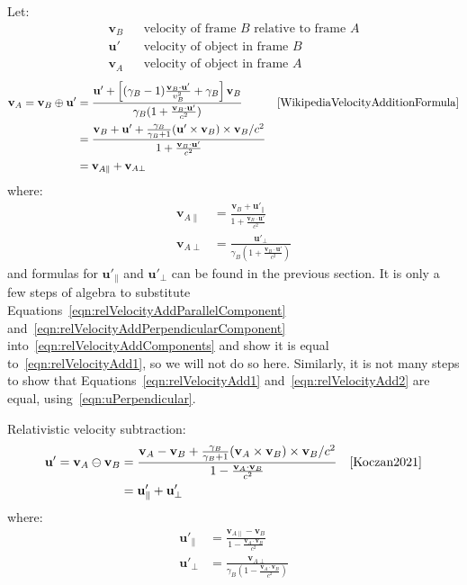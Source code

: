 \documentclass[a4paper]{article}
\theoremstyle{plain}
\theoremstyle{definition}
\newcommand{\vect}[1]{\mathbf{#1}}
\begin{document}
Let:
\begin{align*}
  \vect{v}_B & & \text{velocity of frame $B$ relative to frame $A$} \\
  \vect{u}' & & \text{velocity of object in frame $B$} \\
  \vect{v}_A & & \text{velocity of object in frame $A$}
\end{align*}
\begin{align}
\vect{v}_A = \vect{v}_B \oplus \vect{u}'
  & = \frac{ \vect{u}' + \left[ (\gamma_B-1) \frac{\vect{v}_B \cdot \vect{u}'}{v_B^2} + \gamma_B \right] \vect{v}_B }
           { \gamma_B (1 + \frac{\vect{v}_B \cdot \vect{u}'}{c^2}) } & & \text{\cite{WikipediaVelocityAdditionFormula}} \label{eqn:relVelocityAdd1} \\
  & = \frac{ \vect{v}_B + \vect{u}' + \frac{\gamma_B}{\gamma_B+1} (\vect{u}' \times \vect{v}_B) \times \vect{v}_B / c^2 }
           { 1 + \frac{\vect{v}_B \cdot \vect{u}'}{c^2} } \label{eqn:relVelocityAdd2} \\
  & = \vect{v}_{A \parallel} + \vect{v}_{A \perp} \label{eqn:relVelocityAddComponents}
\end{align}
where:
\begin{align}
\vect{v}_{A \parallel}
  & = \frac{ \vect{v}_B + \vect{u}'_{\parallel} }{1 + \frac{ \vect{v}_B \cdot \vect{u}'}{c^2} } \label{eqn:relVelocityAddParallelComponent} \\
\vect{v}_{A \perp}
  & = \frac{ \vect{u}'_{\perp} }{\gamma_B (1 + \frac{ \vect{v}_B \cdot \vect{u}'}{c^2} )} \label{eqn:relVelocityAddPerpendicularComponent}
\end{align}
and formulas for $\vect{u}'_{\parallel}$ and $\vect{u}'_{\perp}$ can
be found in the previous section.  It is only a few steps of algebra
to substitute Equations~\eqref{eqn:relVelocityAddParallelComponent}
and~\eqref{eqn:relVelocityAddPerpendicularComponent}
into~\eqref{eqn:relVelocityAddComponents} and show it is equal
to~\eqref{eqn:relVelocityAdd1}, so we will not do so here.
Similarly, it is not many steps to show that
Equations~\eqref{eqn:relVelocityAdd1} and~\eqref{eqn:relVelocityAdd2}
are equal, using~\eqref{eqn:uPerpendicular}.

Relativistic velocity subtraction:
\begin{align}
\vect{u}' = \vect{v}_A \ominus \vect{v}_B
  & = \frac{ \vect{v}_A - \vect{v}_B + \frac{\gamma_B}{\gamma_B+1} (\vect{v}_A \times \vect{v}_B) \times \vect{v}_B / c^2 }
           { 1 - \frac{\vect{v}_A \cdot \vect{v}_B}{c^2} } & & \text{\cite{Koczan2021}} \\
  & = \vect{u}'_{\parallel} + \vect{u}'_{\perp} \label{eqn:relVelocitySubComponents}
\end{align}
where:
\begin{align}
\vect{u}'_{\parallel}
  & = \frac{ \vect{v}_{A \parallel} - \vect{v}_B}{1 - \frac{ \vect{v}_A \cdot \vect{v}_B}{c^2} } \label{eqn:relVelocitySubParallelComponent} \\
\vect{u}'_{\perp}
  & = \frac{ \vect{v}_{A \perp} }{\gamma_B (1 - \frac{ \vect{v}_A \cdot \vect{v}_B}{c^2} )} \label{eqn:relVelocitySubPerpendicularComponent}
\end{align}
\end{document}

